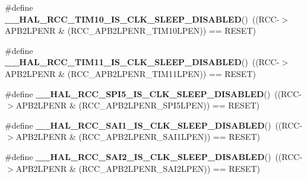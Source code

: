 \begin{DoxyCompactItemize}
\item 
\mbox{\label{group___r_c_c___clock___sleep___enable___disable___status_ga6fe0d52321bc2c97d649ddcc335bffc4}} 
\#define {\bfseries \+\_\+\+\_\+\+H\+A\+L\+\_\+\+R\+C\+C\+\_\+\+T\+I\+M10\+\_\+\+I\+S\+\_\+\+C\+L\+K\+\_\+\+S\+L\+E\+E\+P\+\_\+\+D\+I\+S\+A\+B\+L\+ED}()~((R\+CC-\/$>$A\+P\+B2\+L\+P\+E\+NR \& (R\+C\+C\+\_\+\+A\+P\+B2\+L\+P\+E\+N\+R\+\_\+\+T\+I\+M10\+L\+P\+EN)) == R\+E\+S\+ET)
\item 
\mbox{\label{group___r_c_c___clock___sleep___enable___disable___status_gabf2f10634fa4a6a8b4957e46611d2824}} 
\#define {\bfseries \+\_\+\+\_\+\+H\+A\+L\+\_\+\+R\+C\+C\+\_\+\+T\+I\+M11\+\_\+\+I\+S\+\_\+\+C\+L\+K\+\_\+\+S\+L\+E\+E\+P\+\_\+\+D\+I\+S\+A\+B\+L\+ED}()~((R\+CC-\/$>$A\+P\+B2\+L\+P\+E\+NR \& (R\+C\+C\+\_\+\+A\+P\+B2\+L\+P\+E\+N\+R\+\_\+\+T\+I\+M11\+L\+P\+EN)) == R\+E\+S\+ET)
\item 
\mbox{\label{group___r_c_c___clock___sleep___enable___disable___status_ga87122c894f691156d000537b3e963e5d}} 
\#define {\bfseries \+\_\+\+\_\+\+H\+A\+L\+\_\+\+R\+C\+C\+\_\+\+S\+P\+I5\+\_\+\+I\+S\+\_\+\+C\+L\+K\+\_\+\+S\+L\+E\+E\+P\+\_\+\+D\+I\+S\+A\+B\+L\+ED}()~((R\+CC-\/$>$A\+P\+B2\+L\+P\+E\+NR \& (R\+C\+C\+\_\+\+A\+P\+B2\+L\+P\+E\+N\+R\+\_\+\+S\+P\+I5\+L\+P\+EN)) == R\+E\+S\+ET)
\item 
\mbox{\label{group___r_c_c___clock___sleep___enable___disable___status_ga260939535e89c796b23f9c79a23967e6}} 
\#define {\bfseries \+\_\+\+\_\+\+H\+A\+L\+\_\+\+R\+C\+C\+\_\+\+S\+A\+I1\+\_\+\+I\+S\+\_\+\+C\+L\+K\+\_\+\+S\+L\+E\+E\+P\+\_\+\+D\+I\+S\+A\+B\+L\+ED}()~((R\+CC-\/$>$A\+P\+B2\+L\+P\+E\+NR \& (R\+C\+C\+\_\+\+A\+P\+B2\+L\+P\+E\+N\+R\+\_\+\+S\+A\+I1\+L\+P\+EN)) == R\+E\+S\+ET)
\item 
\mbox{\label{group___r_c_c___clock___sleep___enable___disable___status_ga22103da2b2c092a0be896cce875d5da7}} 
\#define {\bfseries \+\_\+\+\_\+\+H\+A\+L\+\_\+\+R\+C\+C\+\_\+\+S\+A\+I2\+\_\+\+I\+S\+\_\+\+C\+L\+K\+\_\+\+S\+L\+E\+E\+P\+\_\+\+D\+I\+S\+A\+B\+L\+ED}()~((R\+CC-\/$>$A\+P\+B2\+L\+P\+E\+NR \& (R\+C\+C\+\_\+\+A\+P\+B2\+L\+P\+E\+N\+R\+\_\+\+S\+A\+I2\+L\+P\+EN)) == R\+E\+S\+ET)
\end{DoxyCompactItemize}


